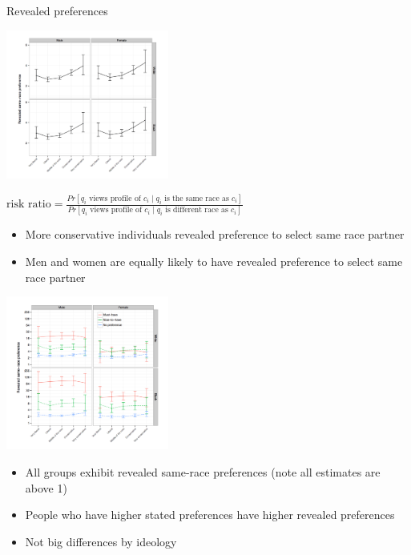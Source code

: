 \documentclass[aspectratio=169]{beamer}
\begin{document}
\begin{frame}

\begin{center}
Revealed preferences
\end{center}

\end{frame}
\begin{frame}

\begin{center}
\includegraphics[width=0.4\textwidth]{figures/anderson_political_2014_fig4}
\end{center}
\vspace{-0.1in}
{\tiny
$\text{risk ratio} = \frac{Pr[q_i \text{ views profile of } c_i \mid q_i \text{ is the same race as } c_i ]}{Pr[q_i \text{ views profile of } c_i \mid q_i \text{ is different race as } c_i ]}$}

\pause
\begin{itemize}
\item More conservative individuals revealed preference to select same race partner \pause
\item Men and women are equally likely to have revealed preference to select same race partner
\end{itemize}
\end{frame}
\begin{frame}

\begin{center}
\includegraphics[width=0.4\textwidth]{figures/anderson_political_2014_fig5}
\end{center}
\vfill
\pause
\begin{itemize}
\item All groups exhibit revealed same-race preferences (note all estimates are above 1) \pause
\item People who have higher stated preferences have higher revealed preferences \pause
\item Not big differences by ideology
\end{itemize}

\end{frame}
\end{document}
